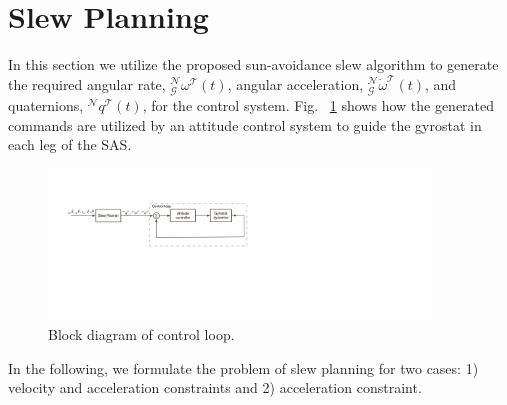 \documentclass[journal ]{new-aiaa}
\begin{document}
	
	\section{Slew Planning} \label{slew_planning}
	In this section we utilize the proposed sun-avoidance slew algorithm to generate the required angular rate, $_\mathcal{G}^\mathcal{N}\omega^\mathcal{T}(t)$, angular acceleration, $_\mathcal{G}^\mathcal{N}\dot{\omega}^\mathcal{T}(t)$, and quaternions, $^\mathcal{N}q^\mathcal{T}(t)$, for the control system. Fig. ~\ref{guidance_loop} shows how the generated commands are utilized by an attitude control system to guide the gyrostat in each leg of the SAS.
		\begin{figure}[h!]
		\centering
			\includegraphics[width=4in]{./Figures/guidance_loop}  
			\caption{Block diagram of control loop. }
			\label{guidance_loop}
	\end{figure}	
	In the following, we formulate the problem of slew planning for two cases: 1) velocity and acceleration constraints and 2) acceleration constraint.
\end{document}
